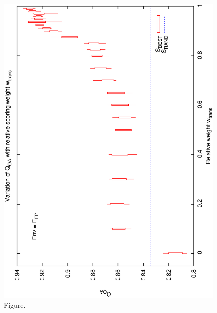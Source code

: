 \documentclass[12pt,a4paper]{article}
\begin{document}
\begin{figure}[htbp]
 \begin{center}
  \includegraphics[scale=1.0, angle=0]{figures/cs1_dw1_oa.eps}
 \end{center}
  \caption[Figure.]
{Figure.}
\end{figure}
\clearpage
\end{document}
